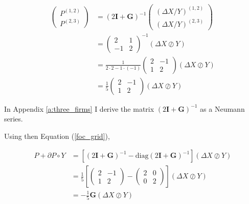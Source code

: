 \documentclass[american]{scrartcl}
\newcommand{\matr}[1]{\bm{#1}}
\newcommand{\diag}{\text{diag}}
\begin{document}
\begin{equation*}
	\begin{split}
		\begin{pmatrix}
			P^{(1, 2)} \\
			P^{(2, 3)}
		\end{pmatrix} &= (2\matr{I} + \matr{G})^{-1} \begin{pmatrix}
			(\Delta X / Y)^{(1, 2)} \\
			(\Delta X / Y)^{(2, 3)}
		\end{pmatrix} \\
		&= \begin{pmatrix}
			2  & 1 \\
			-1 & 2
		\end{pmatrix}^{-1} (\Delta X \oslash Y)\\
		&= \frac{1}{2 \cdot 2 - 1 \cdot (-1)} \begin{pmatrix}
			2 & - 1 \\
			1 & 2
		\end{pmatrix} (\Delta X \oslash Y) \\
		&= \frac{1}{5} \begin{pmatrix}
			2 & - 1 \\
			1 & 2
		\end{pmatrix} (\Delta X \oslash Y)
	\end{split}
\end{equation*}

In Appendix \ref{a:three_firms} I derive the matrix $(2 \matr{I} + \matr{G})^{-1}$ as a Neumann series.

Using then Equation (\ref{foc_grid}),

\begin{equation}
	\begin{split}
		P + \partial P \circ Y &= \left[ (2 \matr{I} + \matr{G})^{-1} - \diag(2 \matr{I} + \matr{G})^{-1}  \right] (\Delta X \oslash Y) \\
		&= \frac{1}{5} \left[ \begin{pmatrix}
				2 & - 1 \\
				1 & 2
			\end{pmatrix} -  \begin{pmatrix}
				2 & 0 \\
				0 & 2
			\end{pmatrix}\right] (\Delta X \oslash Y) \\
		&= -\frac{1}{5} \matr{G} (\Delta X \oslash Y)
	\end{split}
\end{equation}
\end{document}
